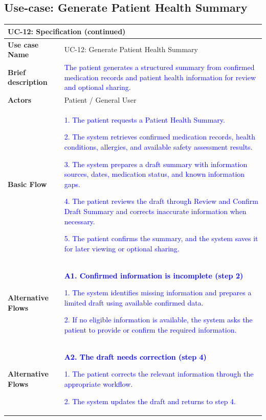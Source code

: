 \subsection{Use-case: Generate Patient Health Summary}
\label{uc:uc-12}
\begin{longtable}{|p{}|p{}|}
\hline
\endfirsthead
\multicolumn{2}{l}{\textbf{UC-12: Specification (continued)}}\\
\hline
\endhead
\textbf{Use case Name} & UC-12: Generate Patient Health Summary \\ \hline
\textbf{Brief description} &
\textcolor{blue}{The patient generates a structured summary from confirmed medication records and patient health information for review and optional sharing.}
\\ \hline
\textbf{Actors} & Patient / General User \\ \hline
\textbf{Basic Flow} &
\textcolor{blue}{1. The patient requests a Patient Health Summary.}\par
\textcolor{blue}{2. The system retrieves confirmed medication records, health conditions, allergies, and available safety assessment results.}\par
\textcolor{blue}{3. The system prepares a draft summary with information sources, dates, medication status, and known information gaps.}\par
\textcolor{blue}{4. The patient reviews the draft through Review and Confirm Draft Summary and corrects inaccurate information when necessary.}\par
\textcolor{blue}{5. The patient confirms the summary, and the system saves it for later viewing or optional sharing.}
\\ \hline
\textbf{Alternative Flows} &
\textcolor{blue}{\textbf{A1. Confirmed information is incomplete (step 2)}}\par
\textcolor{blue}{1. The system identifies missing information and prepares a limited draft using available confirmed data.}\par
\textcolor{blue}{2. If no eligible information is available, the system asks the patient to provide or confirm the required information.}
\\ \hline
\textbf{Alternative Flows} &
\textcolor{blue}{\textbf{A2. The draft needs correction (step 4)}}\par
\textcolor{blue}{1. The patient corrects the relevant information through the appropriate workflow.}\par
\textcolor{blue}{2. The system updates the draft and returns to step 4.}

\end{longtable}
